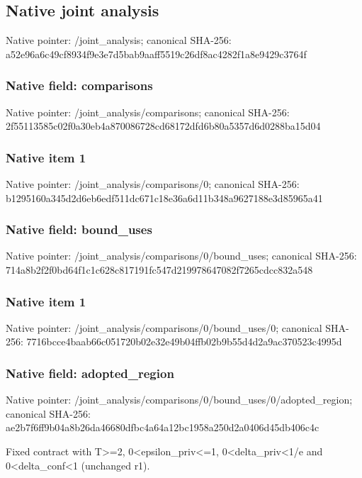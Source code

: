 \documentclass[10pt,a4paper]{article}
\begin{document}
\subsection{Native joint analysis}
Native pointer: /joint\_\allowbreak{}analysis; canonical SHA-256: a52e96a6c49cf8934f9e3e7d5bab9aaff5519c26df8ac4282f1a8e9429c3764f

\subsubsection{Native field: comparisons}
Native pointer: /joint\_\allowbreak{}analysis/comparisons; canonical SHA-256: 2f55113585c02f0a30eb4a870086728cd68172dfd6b80a5357d6d0288ba15d04

\subsubsection{Native item 1}
Native pointer: /joint\_\allowbreak{}analysis/comparisons/0; canonical SHA-256: b1295160a345d2d6eb6edf511dc671c18e36a6d11b348a9627188e3d85965a41

\subsubsection{Native field: bound\_\allowbreak{}uses}
Native pointer: /joint\_\allowbreak{}analysis/comparisons/0/bound\_\allowbreak{}uses; canonical SHA-256: 714a8b2f2f0bd64f1c1c628c817191fc547d219978647082f7265cdcc832a548

\subsubsection{Native item 1}
Native pointer: /joint\_\allowbreak{}analysis/comparisons/0/bound\_\allowbreak{}uses/0; canonical SHA-256: 7716bcce4baab66c051720b02e32e49b04ffb02b9b55d4d2a9ac370523c4995d

\subsubsection{Native field: adopted\_\allowbreak{}region}
Native pointer: /joint\_\allowbreak{}analysis/comparisons/0/bound\_\allowbreak{}uses/0/adopted\_\allowbreak{}region; canonical SHA-256: ae2b7f6ff9b04a8b26da46680dfbc4a64a12bc1958a250d2a0406d45db406c4c

\begingroup\raggedright\sloppy Fixed contract with T>=\allowbreak{}2,\allowbreak{} 0<epsilon\_\allowbreak{}priv<=\allowbreak{}1,\allowbreak{} 0<delta\_\allowbreak{}priv<1/\allowbreak{}e and 0<delta\_\allowbreak{}conf<1 (unchanged r1).\par\endgroup
\end{document}
